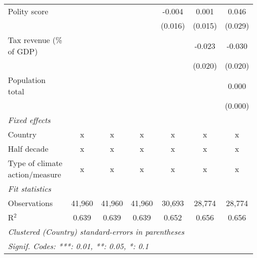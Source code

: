 \begin{tabular}{lcccccc}
   Polity score                                                          &         &                &                & -0.004         & 0.001          & 0.046\\   
                                                                         &         &                &                & (0.016)        & (0.015)        & (0.029)\\   
   Tax revenue (\% of GDP)                                               &         &                &                &                & -0.023         & -0.030\\   
                                                                         &         &                &                &                & (0.020)        & (0.020)\\   
   Population total                                                      &         &                &                &                &                & 0.000\\   
                                                                         &         &                &                &                &                & (0.000)\\   
   \emph{Fixed effects}\\
   Country                                                               & x       & x              & x              & x              & x              & x\\  
   Half decade                                                           & x       & x              & x              & x              & x              & x\\  
   Type of climate action/measure                                        & x       & x              & x              & x              & x              & x\\  
   \midrule \emph{Fit statistics}\\
   Observations                                                          & 41,960  & 41,960         & 41,960         & 30,693         & 28,774         & 28,774\\  
   R$^2$                                                                 & 0.639   & 0.639          & 0.639          & 0.652          & 0.656          & 0.656\\  
   \midrule
   \multicolumn{7}{l}{\emph{Clustered (Country) standard-errors in parentheses}}\\
   \multicolumn{7}{l}{\emph{Signif. Codes: ***: 0.01, **: 0.05, *: 0.1}}\\
\end{tabular}
\par\endgroup


